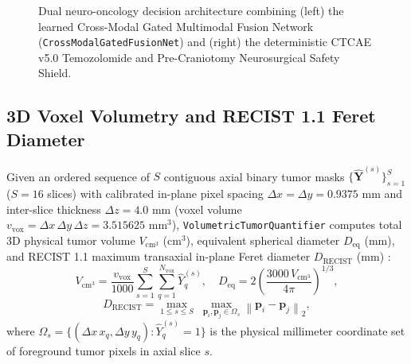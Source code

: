 \documentclass[conference]{IEEEtran}
\begin{document}
\begin{figure}[t]
\caption{Dual neuro-oncology decision architecture combining (left) the learned Cross-Modal Gated Multimodal Fusion Network (\texttt{CrossModalGatedFusionNet}) and (right) the deterministic CTCAE v5.0 Temozolomide and Pre-Craniotomy Neurosurgical Safety Shield.}
\label{fig:fusion}
\end{figure}

\subsection{3D Voxel Volumetry and RECIST 1.1 Feret Diameter}
Given an ordered sequence of $S$ contiguous axial binary tumor masks $\{\hat{\mathbf{Y}}^{(s)}\}_{s=1}^S$ ($S = 16$ slices) with calibrated in-plane pixel spacing $\Delta x = \Delta y = 0.9375\text{ mm}$ and inter-slice thickness $\Delta z = 4.0\text{ mm}$ (voxel volume $v_{\text{vox}} = \Delta x\,\Delta y\,\Delta z = 3.515625\text{ mm}^3$), \texttt{VolumetricTumorQuantifier} computes total 3D physical tumor volume $V_{\text{cm}^3}$ ($\text{cm}^3$), equivalent spherical diameter $D_{\text{eq}}$ ($\text{mm}$), and RECIST 1.1 maximum transaxial in-plane Feret diameter $D_{\text{RECIST}}$ ($\text{mm}$) \cite{eisenhauer2009recist}:
\begin{equation}
    V_{\text{cm}^3} = \frac{v_{\text{vox}}}{1000}\sum_{s=1}^{S}\sum_{q=1}^{N_{\text{vox}}} \hat{Y}^{(s)}_q, \quad D_{\text{eq}} = 2\!\left(\frac{3000\,V_{\text{cm}^3}}{4\pi}\right)^{1/3},
    \label{eq:volumetry}
\end{equation}
\begin{equation}
    D_{\text{RECIST}} = \max_{1 \le s \le S}\; \max_{\mathbf{p}_i, \mathbf{p}_j \in \Omega_s} \left\|\mathbf{p}_i - \mathbf{p}_j\right\|_2,
    \label{eq:recist}
\end{equation}
where $\Omega_s = \{(\Delta x\,x_q, \Delta y\,y_q) : \hat{Y}^{(s)}_q = 1\}$ is the physical millimeter coordinate set of foreground tumor pixels in axial slice $s$.
\end{document}
